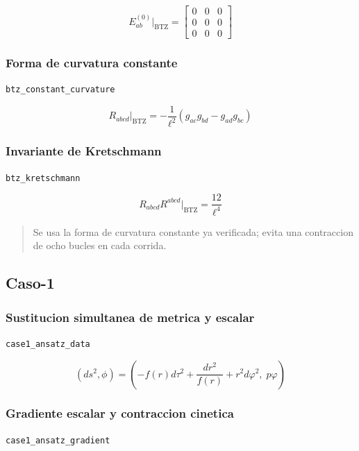 \documentclass[11pt,a4paper]{article}
\begin{document}
\[
E^{(0)}_{ab}\big|_{\mathrm{BTZ}} = \left[\begin{matrix}0 & 0 & 0\\0 & 0 & 0\\0 & 0 & 0\end{matrix}\right]
\]

\subsubsection{Forma de curvatura constante}

\noindent\texttt{btz\_constant\_curvature}\par\nopagebreak[4]

\[
R_{abcd}\big|_{\mathrm{BTZ}} = -\frac{1}{\ell^2}(g_{ac}g_{bd}-g_{ad}g_{bc})
\]

\subsubsection{Invariante de Kretschmann}

\noindent\texttt{btz\_kretschmann}\par\nopagebreak[4]

\[
R_{abcd}R^{abcd}\big|_{\mathrm{BTZ}} = \frac{12}{\ell^4}
\]

\begin{quote}\small Se usa la forma de curvatura constante ya verificada; evita una contraccion de ocho bucles en cada corrida.\end{quote}

\subsection{Caso-1}

\subsubsection{Sustitucion simultanea de metrica y escalar}

\noindent\texttt{case1\_ansatz\_data}\par\nopagebreak[4]

\[
(ds^2,\phi) = \left(-f(r)d\tau^2+\frac{dr^2}{f(r)}+r^2d\varphi^2,\;p\varphi\right)
\]

\subsubsection{Gradiente escalar y contraccion cinetica}

\noindent\texttt{case1\_ansatz\_gradient}\par\nopagebreak[4]
\end{document}

